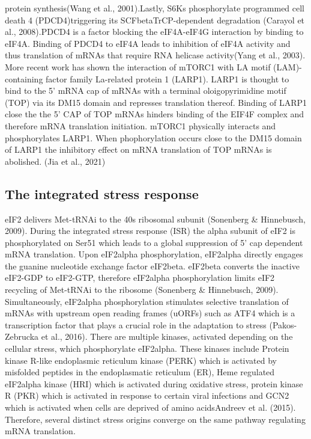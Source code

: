 \documentclass[
  12pt,
  openany]{book}
\begin{document}
protein synthesis(Wang et al., 2001).Lastly, S6Ks phosphorylate programmed cell death 4 (PDCD4)triggering its SCFbetaTrCP-dependent
degradation (Carayol et al., 2008).PDCD4 is a factor blocking the eIF4A-eIF4G interaction by binding to eIF4A. Binding of PDCD4 to eIF4A leads to inhibition of eIF4A activity and thus translation of mRNAs that require RNA helicase activity(Yang et al., 2003). More recent work has shown the interaction of mTORC1 with LA motif (LAM)-containing factor family La-related protein 1 (LARP1). LARP1 is thought to bind to the 5' mRNA cap of mRNAs with a terminal oloigopyrimidine motif (TOP) via its DM15 domain and represses translation thereof. Binding of LARP1 close the the 5' CAP of TOP mRNAs hinders binding of the EIF4F complex and therefore mRNA translation initiation. mTORC1 physically interacts and phosphorylates LARP1. When phophorylation occurs close to the DM15 domain of LARP1 the inhibitory effect on mRNA translation of TOP mRNAs is abolished. (Jia et al., 2021)

\subsection{The integrated stress response}

eIF2 delivers Met-tRNAi to the 40s ribosomal subunit (Sonenberg \& Hinnebusch, 2009). During the integrated stress response (ISR) the alpha subunit of eIF2 is phosphorylated on Ser51 which leads to a global suppression of 5' cap dependent mRNA translation. Upon eIF2alpha phosphorylation, eIF2alpha directly engages the guanine nucleotide exchange factor eIF2beta. eIF2beta converts the inactive eIF2-GDP to eIF2-GTP, therefore eIF2alpha phosphorylation limits eIF2 recycling of Met-tRNAi to the ribosome (Sonenberg \& Hinnebusch, 2009). Simultaneously, eIF2alpha phosphorylation stimulates selective translation of mRNAs with upstream open reading frames (uORFs) such as ATF4 which is a transcription factor that plays a crucial role in the adaptation to stress (Pakos-Zebrucka et al., 2016). There are multiple kinases, activated depending on the cellular stress, which phosphorylate eIF2alpha. These kinases include Protein kinase R-like endoplasmic reticulum kinase (PERK) which is activated by misfolded peptides in the endoplasmatic reticulum (ER), Heme regulated eIF2alpha kinase (HRI) which is activated during oxidative stress, protein kinase R (PKR) which is activated in response to certain viral infections and GCN2 which is activated when cells are deprived of amino acidsAndreev et al. (2015). Therefore, several distinct stress origins converge on the same pathway regulating mRNA translation.
\end{document}
